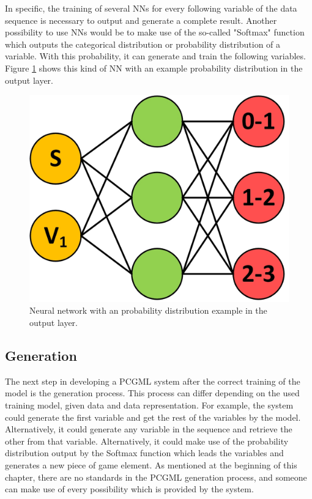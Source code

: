 \documentclass[MGS,Master,english]{twbook}%
\begin{document}
In specific, the training of several \acp{NN} for every following variable of the data sequence is necessary to output and generate a complete result. Another possibility to use \acp{NN} would be to make use of the so-called "Softmax" function which outputs the categorical distribution or probability distribution of a variable. With this probability, it can generate and train the following variables. Figure \ref{fig::PCGML::devExample::NNwithSoftmax} shows this kind of NN with an example probability distribution in the output layer.
\begin{figure}[!htbp]
	\centering
	\includegraphics[width=0.3\linewidth]{PICs/NNs/PCGML_development_example_NN_categorical_distributions}
	\caption{Neural network with an probability distribution example in the output layer.}\label{fig::PCGML::devExample::NNwithSoftmax}
\end{figure}


\subsection{Generation}
The next step in developing a PCGML system after the correct training of the model is the generation process. This process can differ depending on the used training model, given data and data representation. For example, the system could generate the first variable and get the rest of the variables by the model. Alternatively, it could generate any variable in the sequence and retrieve the other from that variable. Alternatively, it could make use of the probability distribution output by the Softmax function which leads the variables and generates a new piece of game element. As mentioned at the beginning of this chapter, there are no standards in the PCGML generation process, and someone can make use of every possibility which is provided by the system.
 
%
%
\clearpage
\end{document}
